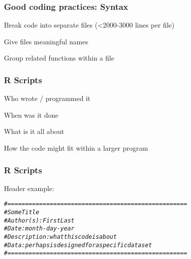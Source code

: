 \documentclass[12pt]{beamer}\usepackage[]{graphicx}\usepackage[]{color}
\makeatletter
\newcommand{\hlcom}[1]{\textcolor[rgb]{0.678,0.584,0.686}{\textit{#1}}}%
\newenvironment{kframe}{%
 \def\at@end@of@kframe{}%
 \ifinner\ifhmode%
  \def\at@end@of@kframe{\end{minipage}}%
  \begin{minipage}{\columnwidth}%
 \fi\fi%
 \def\FrameCommand##1{\hskip\@totalleftmargin \hskip-\fboxsep
 \colorbox{shadecolor}{##1}\hskip-\fboxsep
     \hskip-\linewidth \hskip-\@totalleftmargin \hskip\columnwidth}%
 \MakeFramed {\advance\hsize-\width
   \@totalleftmargin\z@ \linewidth\hsize
   \@setminipage}}%
 {\par\unskip\endMakeFramed%
 \at@end@of@kframe}
\newenvironment{knitrout}{}{} %
\makeatother
\begin{document}

\begin{frame}
\frametitle{Good coding practices: Syntax}

\bi
 \item Break code into separate files (<2000-3000 lines per file) 
 \item Give files meaningful names 
 \item Group related functions within a file
\ei
\eb

\end{frame}


\begin{frame}
\frametitle{R Scripts}

\bi
 \item Who wrote / programmed it
 \item When was it done
 \item What is it all about
 \item How the code might fit within a larger program
\ei
\eb

\end{frame}


\begin{frame}[fragile]
\frametitle{R Scripts}

Header example:
\begin{knitrout}\footnotesize
{}\color{fgcolor}\begin{kframe}
\begin{alltt}
\hlcom{# ===================================================}
\hlcom{# Some Title}
\hlcom{# Author(s): First Last}
\hlcom{# Date: month-day-year}
\hlcom{# Description: what this code is about}
\hlcom{# Data: perhaps is designed for a specific data set}
\hlcom{# ===================================================}
\end{alltt}
\end{kframe}
\end{knitrout}

\end{frame}

\end{document}
